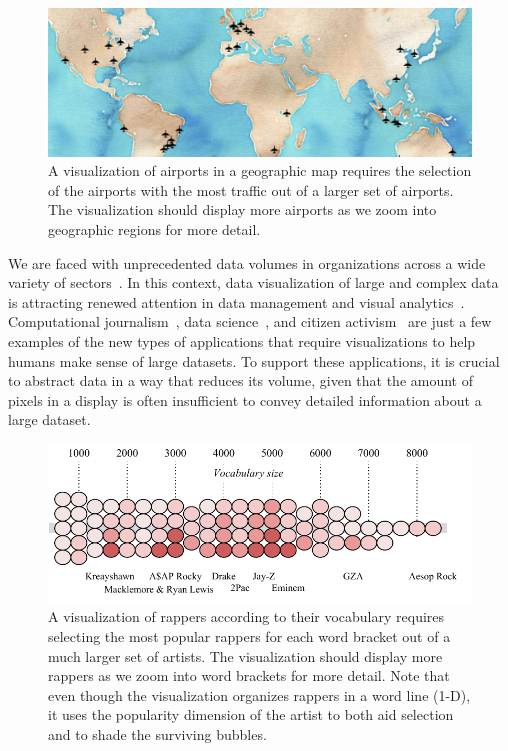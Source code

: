 \documentclass[11pt, oneside]{report}
\begin{document}
{\begin{figure}[htbp]
\begin{center}
\includegraphics[width=0.99\linewidth]{figs-glossy/airports.png}
\caption{A visualization of airports in a geographic map requires the selection of the airports with the most traffic out of a larger set of airports. The visualization should display more airports as we zoom into geographic regions for more detail.}
\label{fig:example:airports}
\end{center}
\end{figure}

We are faced with unprecedented data volumes in organizations across a wide variety of sectors~\cite{manyika2011bigdata}. In this context, data visualization of large and complex data is attracting renewed attention in data management and visual analytics~\cite{fekete2012dmvis,morton2014visclean,wu2014case}. Computational journalism~\cite{cohen2011journalism}, data science~\cite{kandel2012interviewstudy}, and citizen activism~\cite{viegas2009manyeyes} are just a few examples of the new types of applications that require visualizations to help humans make sense of large datasets. To support these applications, it is crucial to abstract data in a way that reduces its volume, given that the amount of pixels in a display is often insufficient to convey detailed information about a large dataset.

\newpage

\begin{figure}[htbp]
\begin{center}
\includegraphics[width=0.99\linewidth]{figs-glossy/rappers_viz.pdf}
\caption{A visualization of rappers according to their vocabulary requires selecting the most popular rappers for each word bracket out of a much larger set of artists. The visualization should display more rappers as we zoom into word brackets for more detail. Note that even though the visualization organizes rappers in a word line (1-D), it uses the popularity dimension of the artist to both aid selection and to shade the surviving bubbles.}
\label{fig:example:rappers}
\end{center}
\end{figure}


}
\end{document}
